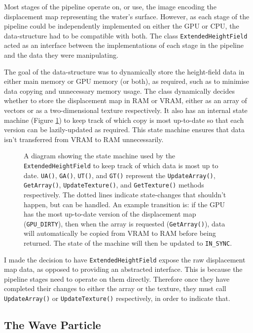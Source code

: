 \documentclass[12pt,a4paper,twoside]{report}
\begin{document}
Most stages of the pipeline operate on, or use, the image encoding the
displacement map representing the water's surface. However, as each stage of
the pipeline could be independently implemented on either the GPU or CPU, the
data-structure had to be compatible with both. The class
\texttt{ExtendedHeightField} acted as an interface between the implementations
of each stage in the pipeline and the data they were manipulating.

The goal of the data-structure was to dynamically store the height-field data
in either main memory or GPU memory (or both), as required, such as to minimise
data copying and unnecessary memory usage. The class dynamically decides
whether to store the displacement map in RAM or VRAM, either as an array of
vectors or as a two-dimensional texture respectively. It also has an internal
state machine (Figure \ref{fig:map_state_machine}) to keep track of which copy
is most up-to-date so that each version can be lazily-updated as required. This
state machine ensures that data isn't transferred from VRAM to RAM
unnecessarily.

\begin{figure}[h]
\centering
\def\svgwidth{\linewidth}
 \caption{A diagram
showing the state machine used by the \texttt{ExtendedHeightField} to keep
track of which data is most up to date. \texttt{UA()}, \texttt{GA()},
\texttt{UT()}, and \texttt{GT()} represent the \texttt{UpdateArray()},
\texttt{GetArray()}, \texttt{UpdateTexture()}, and \texttt{GetTexture()}
methods respectively. The dotted lines indicate state-changes that shouldn't
happen, but can be handled. An example transition is: if the GPU has the most
up-to-date version of the displacement map (\texttt{GPU\_DIRTY}), then when the
array is requested (\texttt{GetArray()}), data will automatically be copied
from VRAM to RAM before being returned. The state of the machine will then be
updated to \texttt{IN\_SYNC}.}
\label{fig:map_state_machine}
\end{figure}

I made the decision to have \texttt{ExtendedHeightField} expose the raw
displacement map data, as opposed to providing an abstracted interface. This is
because the pipeline stages need to operate on them directly. Therefore once
they have completed their changes to either the array or the texture, they must
call \texttt{UpdateArray()} or \texttt{UpdateTexture()} respectively, in order
to indicate that.

\subsection{The Wave Particle}
\end{document}
